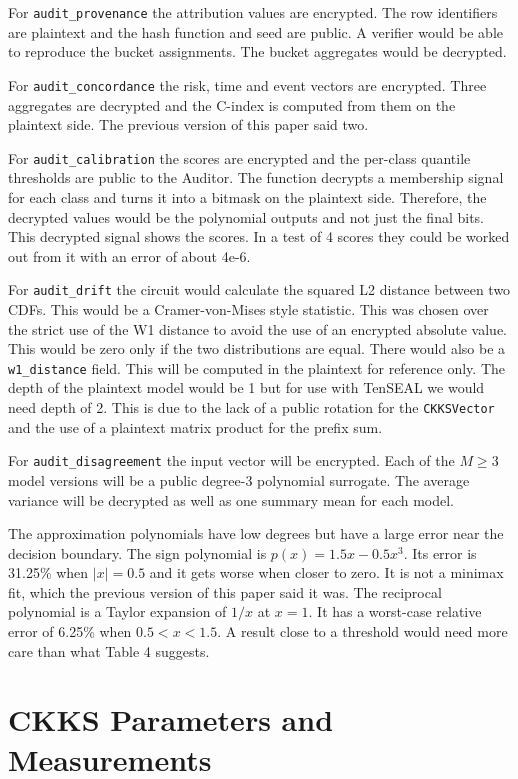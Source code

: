 \documentclass[10pt,a4paper]{article}
\begin{document}
For \texttt{audit\_provenance} the attribution values are encrypted. The row identifiers are plaintext and the hash function and seed are public. A verifier would be able to reproduce the bucket assignments. The bucket aggregates would be decrypted.

For \texttt{audit\_concordance} the risk, time and event vectors are encrypted. Three aggregates are decrypted and the C-index is computed from them on the plaintext side. The previous version of this paper said two.

For \texttt{audit\_calibration} the scores are encrypted and the per-class quantile thresholds are public to the Auditor. The function decrypts a membership signal for each class and turns it into a bitmask on the plaintext side. Therefore, the decrypted values would be the polynomial outputs and not just the final bits. This decrypted signal shows the scores. In a test of 4 scores they could be worked out from it with an error of about 4e-6.

For \texttt{audit\_drift} the circuit would calculate the squared L2 distance between two CDFs. This would be a Cramer-von-Mises style statistic. This was chosen over the strict use of the W1 distance to avoid the use of an encrypted absolute value. This would be zero only if the two distributions are equal. There would also be a \texttt{w1\_distance} field. This will be computed in the plaintext for reference only. The depth of the plaintext model would be 1 but for use with TenSEAL we would need depth of 2. This is due to the lack of a public rotation for the \texttt{CKKSVector} and the use of a plaintext matrix product for the prefix sum.

For \texttt{audit\_disagreement} the input vector will be encrypted. Each of the $M \geq 3$ model versions will be a public degree-3 polynomial surrogate. The average variance will be decrypted as well as one summary mean for each model.

The approximation polynomials have low degrees but have a large error near the decision boundary. The sign polynomial is $p(x) = 1.5x - 0.5x^3$. Its error is 31.25\% when $|x| = 0.5$ and it gets worse when closer to zero. It is not a minimax fit, which the previous version of this paper said it was. The reciprocal polynomial is a Taylor expansion of $1/x$ at $x = 1$. It has a worst-case relative error of 6.25\% when $0.5 < x < 1.5$. A result close to a threshold would need more care than what Table 4 suggests.

\section{CKKS Parameters and Measurements}
\end{document}
